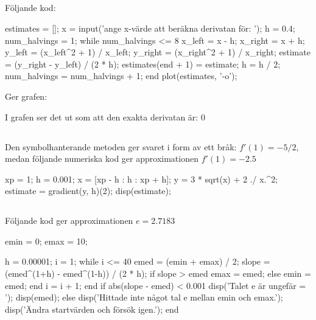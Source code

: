 \subsection*{}
Följande kod:
\vspace{10pt}
\begin{matlab}
estimates = [];
x = input('ange x-värde att beräkna derivatan för: ');
h = 0.4;
num_halvings = 1;
while num_halvings <= 8
	x_left  = x - h;
	x_right = x + h;
	y_left  = (x_left^2 + 1) / x_left;
	y_right = (x_right^2 + 1) / x_right;
	estimate = (y_right - y_left) / (2 * h);
	estimates(end + 1) = estimate;
	h = h / 2;
	num_halvings = num_halvings + 1;
end
plot(estimates, '-o');
\end{matlab}

Ger grafen:

I grafen ser det ut som att den exakta derivatan är: 0
\newpage
\subsection*{}
Den symbolhanterande metoden ger svaret i form av ett bråk: $f'(1) = -5/2$,
medan följande numeriska kod ger approximationen $f'(1) = -2.5$
\vspace{10pt}
\begin{matlab}
xp = 1; %
h = 0.001;
x = [xp - h : h : xp + h];
y = 3 * sqrt(x) + 2 ./ x.^2; %
estimate = gradient(y, h)(2);
disp(estimate);
\end{matlab}

\subsection*{}
Följande kod ger approximationen $e = 2.7183$
\vspace{10pt}
\begin{matlab}
emin = 0; %
emax = 10; %

h = 0.00001; 
i = 1;
while i <= 40 %
	emed = (emin + emax) / 2; %
	slope = (emed^(1+h) - emed^(1-h)) / (2 * h);
	if slope > emed
		emax = emed;
	else
		emin = emed;
	end
	i = i + 1;
end
if abs(slope - emed) < 0.001
	disp('Talet e är ungefär = ');
	disp(emed);
else
	disp('Hittade inte något tal e mellan emin och emax.');
	disp('Ändra startvärden och försök igen.');
end
\end{matlab}
